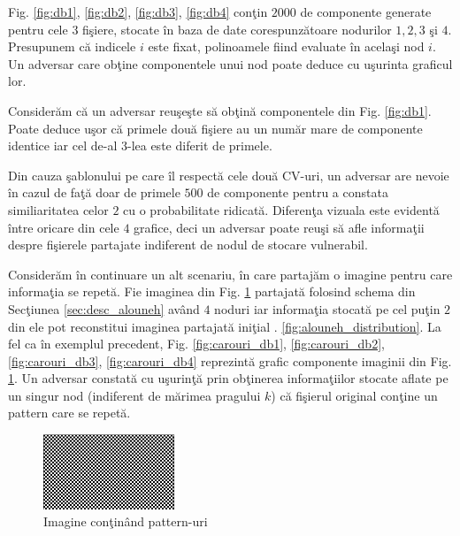 \documentclass{llncs}
\newcommand{\todo}[1]{{\color{red}{TODO #1}}}
\begin{document}
Fig. {\ref{fig:db1}}, {\ref{fig:db2}}, {\ref{fig:db3}}, {\ref{fig:db4}} con\c{t}in $2000$ de componente generate pentru cele $3$ fi\c{s}iere, stocate \^{i}n baza de date corespunz\u{a}toare nodurilor $1,2,3$ \c{s}i $4$. Presupunem c\u{a} indicele $i$ este fixat, polinoamele fiind evaluate \^{i}n acela\c{s}i nod $i$. Un adversar care ob\c{t}ine componentele unui nod poate deduce cu u\c{s}urinta graficul lor.

Consider\u{a}m c\u{a} un adversar reu\c{s}e\c{s}te s\u{a} ob\c{t}in\u{a} componentele din Fig. {\ref{fig:db1}}. Poate deduce u\c{s}or c\u{a} primele dou\u{a} fi\c{s}iere au un num\u{a}r mare de componente identice iar cel de-al $3$-lea este diferit de primele.

Din cauza \c{s}ablonului pe care \^{i}l respect\u{a} cele dou\u{a} CV-uri, un adversar are nevoie \^{i}n cazul de fa\c{t}\u{a} doar de primele $500$ de componente pentru a constata similiaritatea celor $2$ cu o probabilitate ridicat\u{a}.
Diferen\c{t}a vizuala este evident\u{a} \^{i}ntre oricare din cele $4$ grafice, deci un adversar poate reu\c{s}i s\u{a} afle informa\c{t}ii despre fi\c{s}ierele partajate indiferent de nodul de stocare vulnerabil.

Consider\u{a}m \^{i}n continuare un alt scenariu, \^{i}n care partaj\u{a}m o imagine pentru care informa\c{t}ia se repet\u{a}. Fie imaginea din Fig. {\ref{fig:carouri}} partajat\u{a} folosind schema din Sec\c{t}iunea {\ref{sec:desc_alouneh}} av\^{a}nd $4$ noduri iar informa\c{t}ia stocat\u{a} pe cel pu\c{t}in $2$ din ele pot reconstitui imaginea partajat\u{a} ini\c{t}ial \todo{E mai ok acum?}. {\ref{fig:alouneh_distribution}}. La fel ca \^{i}n exemplul precedent, Fig. {\ref{fig:carouri_db1}, \ref{fig:carouri_db2}, \ref{fig:carouri_db3}, \ref{fig:carouri_db4}} reprezint\u{a} grafic componente imaginii din Fig. {\ref{fig:carouri}}. Un adversar constat\u{a} cu u\c{s}urin\c{t}\u{a} prin ob\c{t}inerea informa\c{t}iilor stocate aflate pe un singur nod (indiferent de m\u{a}rimea pragului $k$) c\u{a} fi\c{s}ierul original con\c{t}ine un pattern care se repet\u{a}.


\begin{figure}[H]
\begin{center}
\includegraphics[width=0.35\textwidth]{img/carouri.png}    %
\caption{Imagine con\c{t}in\^{a}nd pattern-uri} 
\label{fig:carouri}
\end{center}
\end{figure}
\end{document}

